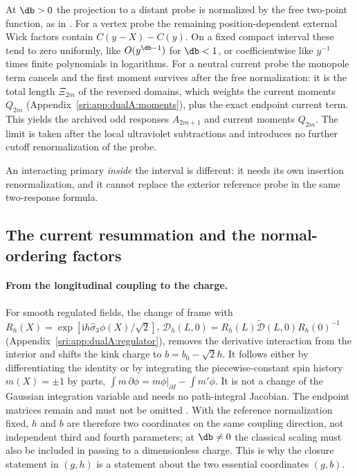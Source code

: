 At $\db>0$ the projection to a distant probe is normalized by the free two-point function, as in
\cite[Eq.~(4.18)]{sri:Benedetti:2025nzp}. For a vertex probe the remaining position-dependent external Wick factors contain
$C(y-X)-C(y)$. On a fixed compact interval these tend to zero uniformly, like $O(y^{\db-1})$ for $\db<1$, or
coefficientwise like $y^{-1}$ times finite polynomials in logarithms. For a neutral current probe the monopole term
cancels and the first moment survives after the free normalization: it is the total length $\Xi_{2m}$ of the reversed domains, which
weights the current moments $Q_{2m}$ (Appendix~\ref{sri:app:dualA:moments}), plus the exact endpoint current term. This yields the
archived odd responses $A_{2m+1}$ and current moments $Q_{2m}$. The limit is taken after the local ultraviolet
subtractions and introduces no further cutoff renormalization of the probe.

An interacting primary \emph{inside} the interval is different: it needs its own insertion renormalization, and it
cannot replace the exterior reference probe in the same two-response formula.

\subsection{The current resummation and the normal-ordering factors}\label{sri:app:clos:current}
\paragraph{From the longitudinal coupling to the charge.} For smooth regulated fields, the change of frame with
$R_h(X)=\exp[\mathrm ih\hat\sigma_3\phi(X)/\sqrt2]$, $\mathcal D_h(L,0)=R_h(L)\widetilde{\mathcal D}(L,0)R_h(0)^{-1}$
(Appendix~\ref{sri:app:dualA:regulator}), removes the derivative interaction from the interior and shifts the kink charge
to $b=b_0-\sqrt2h$. It follows either by differentiating the identity or by integrating the piecewise-constant spin
history $m(X)=\pm1$ by parts, $\int m\,\partial\phi=m\phi|_{\partial I}-\int m'\phi$. It is not a change of the
Gaussian integration variable and needs no path-integral Jacobian. The endpoint matrices remain and must not be
omitted \cite[Sec.~3.2.1]{sri:Benedetti:2025nzp}. With the reference normalization fixed, $h$ and $b$ are therefore two
coordinates on the same coupling direction, not independent third and fourth parameters; at $\db\ne0$ the classical
scaling must also be included in passing to a dimensionless charge. This is why the closure statement in $(g,h)$ is a
statement about the two essential coordinates $(g,b)$.

